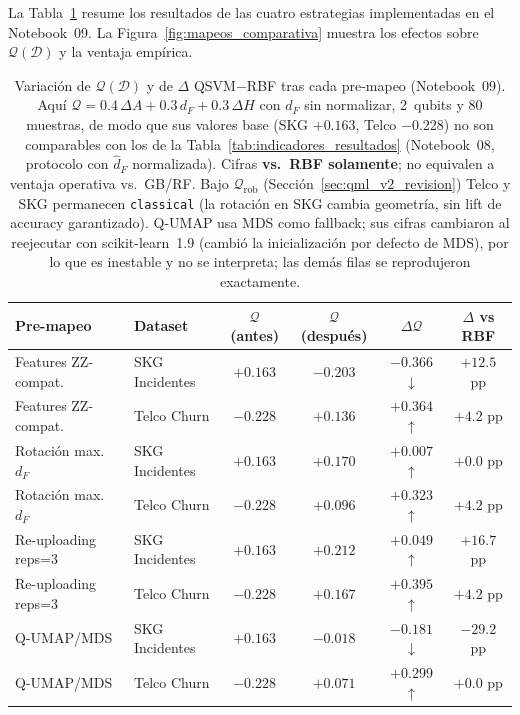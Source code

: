 La Tabla~\ref{tab:resultados_mapeos} resume los resultados de las cuatro estrategias implementadas en el Notebook~09. La Figura~\ref{fig:mapeos_comparativa} muestra los efectos sobre $\mathcal{Q}(\mathcal{D})$ y la ventaja empírica.

\begin{table}[ht]
\centering
\small
\begin{tabular}{llcccc}
\hline
\textbf{Pre-mapeo} & \textbf{Dataset} & $\mathcal{Q}$ (antes) & $\mathcal{Q}$ (después) & $\Delta\mathcal{Q}$ & \textbf{$\Delta$ vs RBF} \\
\hline
Features ZZ-compat.    & SKG Incidentes & $+0.163$ & $-0.203$ & $-0.366$ $\downarrow$ & $+12.5$ pp \\
Features ZZ-compat.    & Telco Churn    & $-0.228$ & $+0.136$ & $+0.364$ $\uparrow$ & $+4.2$ pp \\
Rotación max. $d_F$    & SKG Incidentes & $+0.163$ & $+0.170$ & $+0.007$ $\uparrow$ & $+0.0$ pp \\
Rotación max. $d_F$    & Telco Churn    & $-0.228$ & $+0.096$ & $+0.323$ $\uparrow$ & $+4.2$ pp \\
Re-uploading reps=3    & SKG Incidentes & $+0.163$ & $+0.212$ & $+0.049$ $\uparrow$ & $+16.7$ pp \\
Re-uploading reps=3    & Telco Churn    & $-0.228$ & $+0.167$ & $+0.395$ $\uparrow$ & $+4.2$ pp \\
Q-UMAP/MDS             & SKG Incidentes & $+0.163$ & $-0.018$ & $-0.181$ $\downarrow$ & $-29.2$ pp \\
Q-UMAP/MDS             & Telco Churn    & $-0.228$ & $+0.071$ & $+0.299$ $\uparrow$ & $+0.0$ pp \\
\hline
\end{tabular}
\caption{Variación de $\mathcal{Q}(\mathcal{D})$ y de $\Delta$ QSVM$-$RBF tras cada pre-mapeo (Notebook~09). Aquí $\mathcal{Q}=0.4\,\Delta A+0.3\,d_F+0.3\,\Delta H$ con $d_F$ sin normalizar, 2~qubits y 80 muestras, de modo que sus valores base (SKG $+0.163$, Telco $-0.228$) no son comparables con los de la Tabla~\ref{tab:indicadores_resultados} (Notebook~08, protocolo con $\hat d_F$ normalizada). Cifras \textbf{vs.\ RBF solamente}; no equivalen a ventaja operativa vs.\ GB/RF. Bajo $\mathcal{Q}_{\mathrm{rob}}$ (Sección~\ref{sec:qml_v2_revision}) Telco y SKG permanecen \texttt{classical} (la rotación en SKG cambia geometría, sin lift de accuracy garantizado). Q-UMAP usa MDS como fallback; sus cifras cambiaron al reejecutar con scikit-learn~1.9 (cambió la inicialización por defecto de MDS), por lo que es inestable y no se interpreta; las demás filas se reprodujeron exactamente.}
\label{tab:resultados_mapeos}
\end{table}

